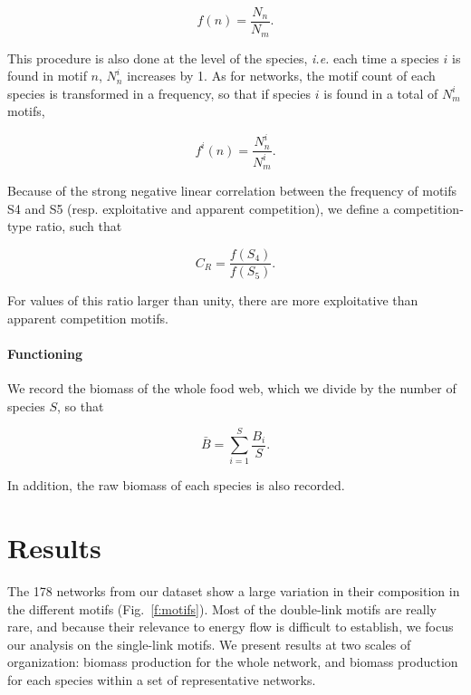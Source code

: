\documentclass[12pt]{article}
\begin{document}
\begin{equation}
	f(n) = \frac{N_{n}}{N_{m}}.
\end{equation}

This procedure is also done at the level of the species, \emph{i.e.} each time a
species $i$ is found in motif $n$, $N_{n}^{i}$ increases by 1. As for networks,
the motif count of each species is transformed in a frequency, so that if
species $i$ is found in a total of $N_{m}^{i}$ motifs,

\begin{equation}
	f^{i}(n) = \frac{N_{n}^{i}}{N_{m}^{i}}.
\end{equation}

Because of the strong negative linear correlation between the frequency of
motifs S4 and S5 (resp. exploitative and apparent competition), we define a
competition-type ratio, such that

\begin{equation}
	C_{R} = \frac{f(S_4)}{f(S_5)}.
\end{equation}

For values of this ratio larger than unity, there are more exploitative than
apparent competition motifs.

\paragraph{Functioning}

We record the biomass of the whole food web, which we divide by the number of
species $S$, so that

\begin{equation}
	\bar B = \sum_{i=1}^{S}\frac{B_{i}}{S}.
\end{equation}

In addition, the raw biomass of each species is also recorded.

\section{Results}

The 178 networks from our dataset show a large variation in their composition in
the different motifs (Fig.~\ref{f:motifs}). Most of the double-link motifs are
really rare, and because their relevance to energy flow is difficult to
establish, we focus our analysis on the single-link motifs. We present results
at two scales of organization: biomass production for the whole network, and
biomass production for each species within a set of representative networks.
\end{document}
